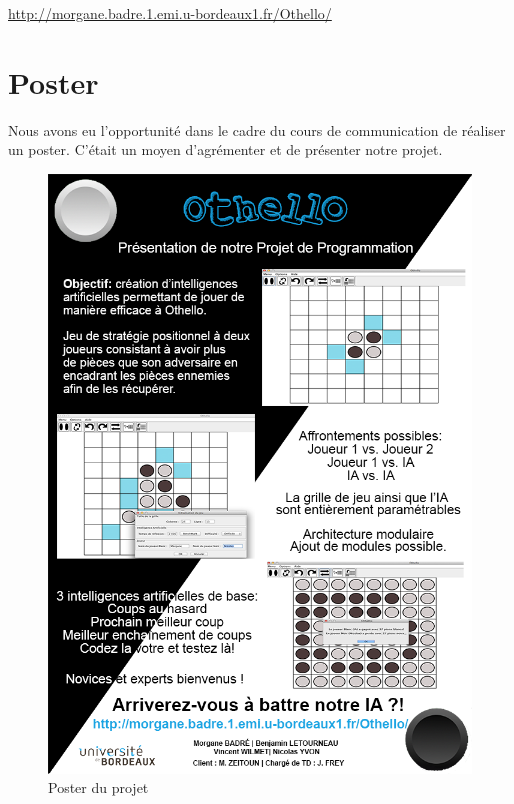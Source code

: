 \documentclass[a4paper,12pt]{report}
\begin{document}
\centerline{\url{http://morgane.badre.1.emi.u-bordeaux1.fr/Othello/}}

\chapter{Poster}

Nous avons eu l’opportunité dans le cadre du cours de communication de réaliser un poster. C’était un moyen d’agrémenter et de présenter notre projet.

\begin{figure}[H]
\centering
\includegraphics[scale=1.5]{Images/posterfinal.png}
\caption{Poster du projet}
\label{poster}
\end{figure}
\end{document}
